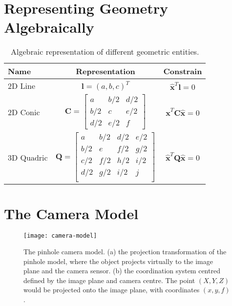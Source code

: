 \documentclass[11pt,twoside]{report}
\begin{document}
\section{Representing Geometry Algebraically}


\begin{SCtable}
	\begin{minipage}[b]{\linewidth}
	\centering
	\begin{tabular}{ l c c }
		\toprule
		Name & Representation & Constrain\\
		\midrule
		2D Line & 
		$ \mathbf{l} = (a, b, c)^T$ &
		$\hat{\mathbf{x}}^T \mathbf{l} = 0$ \\
		2D Conic &
		\parbox{5cm}{
			$$
			\mathbf{C} =
			\begin{bmatrix}
			a & b/2 & d/2\\
			b/2 & c & e/2\\
			d/2 & e/2 & f
			\end{bmatrix}
			$$
		} &
		$ \hat{\mathbf{x}}^T \mathbf{C} \hat{\mathbf{x}} = 0$
		\\
		3D Quadric &
		\parbox{5cm}{
			$$
			\mathbf{Q} =
			\begin{bmatrix}
			a & b/2 & d/2 & e/2\\
			b/2 & e & f/2 & g/2\\
			c/2 & f/2 & h/2 & i/2\\
			d/2 & g/2 & i/2 & j\\
			\end{bmatrix}
			$$
		} &
		$ \hat{\mathbf{x}}^T \mathbf{Q} \hat{\mathbf{x}} = 0$
		\\
	\bottomrule
	\end{tabular}
	\end{minipage}
	
	\caption{Algebraic representation of different geometric entities.}
  \label{table:geometry}
\end{SCtable}


\section{The Camera Model}
\label{section:camera}

\begin{SCfigure}
  \texttt{[image: camera-model]}
  \caption{The pinhole camera model. (a) the projection transformation of the pinhole model, where the object projects virtually to the image plane and the camera sensor. (b) the coordination system centred defined by the image plane and camera centre. The point $(X, Y, Z)$ would be projected onto the image plane, with coordinates $(x, y, f)$.}
  \label{fig:camera_model}
\end{SCfigure}
\end{document}
